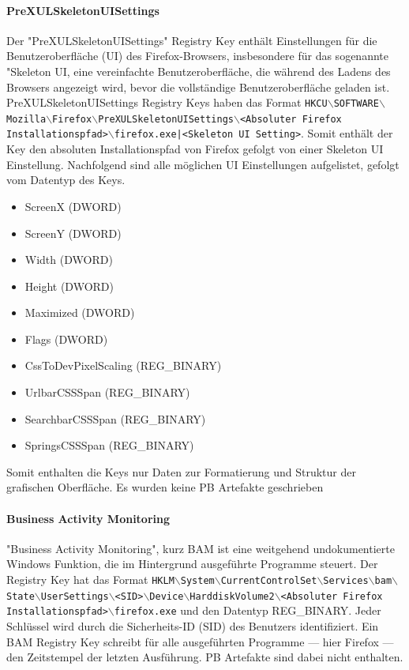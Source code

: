 \paragraph*{PreXULSkeletonUISettings}
Der "PreXULSkeletonUISettings" Registry Key enthält Einstellungen für die Benutzeroberfläche (UI) des Firefox-Browsers, insbesondere für das sogenannte "Skeleton UI, eine vereinfachte Benutzeroberfläche, die während des Ladens des Browsers angezeigt wird, bevor die vollständige Benutzeroberfläche geladen ist. 
PreXULSkeletonUISettings Registry Keys haben das Format \texttt{HKCU$\backslash$SOFTWARE$\backslash$Mozilla$\backslash$Firefox$\backslash$PreXULSkeletonUISettings$\backslash$<Absoluter Firefox Installationspfad>$\backslash$firefox.exe|<Skeleton UI Setting>}.
Somit enthält der Key den absoluten Installationspfad von Firefox gefolgt von einer Skeleton UI Einstellung. Nachfolgend sind alle möglichen UI Einstellungen aufgelistet, gefolgt vom Datentyp des Keys.
\begin{itemize}
	\item ScreenX (DWORD)
	\item ScreenY (DWORD)
	\item Width (DWORD)
	\item Height (DWORD)
	\item Maximized (DWORD)
	\item Flags (DWORD)
	\item CssToDevPixelScaling (REG\_BINARY)
	\item UrlbarCSSSpan (REG\_BINARY)
	\item SearchbarCSSSpan (REG\_BINARY)
	\item SpringsCSSSpan (REG\_BINARY)
\end{itemize}
Somit enthalten die Keys nur Daten zur Formatierung und Struktur der grafischen Oberfläche. Es wurden keine PB Artefakte geschrieben

\paragraph*{Business Activity Monitoring}
"Business Activity Monitoring", kurz BAM ist eine weitgehend undokumentierte Windows Funktion, die im Hintergrund ausgeführte Programme steuert.
Der Registry Key hat das Format \texttt{HKLM$\backslash$System$\backslash$CurrentControlSet$\backslash$Services$\backslash$bam$\backslash$State$\backslash$UserSettings$\backslash$<SID>$\backslash$Device$\backslash$HarddiskVolume2$\backslash$<Absoluter Firefox Installationspfad>$\backslash$firefox.exe} und den Datentyp REG\_BINARY.
Jeder Schlüssel wird durch die Sicherheits-ID (SID) des Benutzers identifiziert.
Ein BAM Registry Key schreibt für alle ausgeführten Programme --- hier Firefox --- den Zeitstempel der letzten Ausführung.
PB Artefakte sind dabei nicht enthalten.

